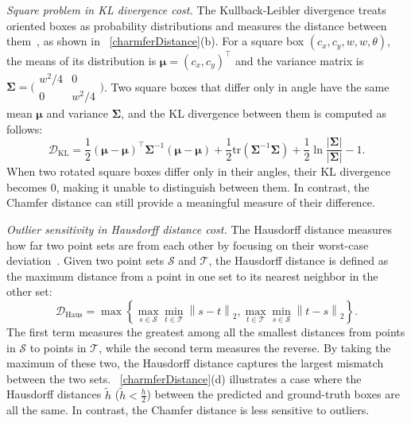 \documentclass[lettersize,journal]{IEEEtran}
\begin{document}
\textit{Square problem in KL divergence cost.}
The Kullback-Leibler divergence treats oriented boxes as probability distributions and measures the distance between them~\cite{kld}, as shown in \figurename~\ref{charmferDistance}(b). For a square box $(c_x, c_y, w, w, \theta)$, the means of its distribution is $\boldsymbol{\mu}=(c_x,c_y)^\top$ and the variance matrix is $\boldsymbol{\Sigma} = \bigl( \begin{smallmatrix} w^2 / 4 & 0 \\ 0 & w^2 / 4 \end{smallmatrix} \bigr)$. Two square boxes that differ only in angle have the same mean $\boldsymbol{\mu}$ and variance $\boldsymbol{\Sigma}$, and the KL divergence between them is computed as follows:
\begin{equation}
\mathcal{D}_{\text{KL}} = \frac{1}{2}(\boldsymbol{\mu}-\boldsymbol{\mu})^\top\boldsymbol{\Sigma}^{-1}(\boldsymbol{\mu}-\boldsymbol{\mu})+
\frac{1}{2}\mathrm{tr}(\boldsymbol{\Sigma}^{-1}\boldsymbol{\Sigma})+
\frac{1}{2}\ln\frac{\left|\boldsymbol{\Sigma}\right|}{\left|\boldsymbol{\Sigma}\right|}-1.
\end{equation}
When two rotated square boxes differ only in their angles, their KL divergence becomes 0, making it unable to distinguish between them. In contrast, the Chamfer distance can still provide a meaningful measure of their difference.



\textit{Outlier sensitivity in Hausdorff distance cost.}
The Hausdorff distance measures how far two point sets are from each other by focusing on their worst-case deviation~\cite{rhino}. Given two point sets $\mathcal{S}$ and $\mathcal{T}$, the Hausdorff distance is defined as the maximum distance from a point in one set to its nearest neighbor in the other set:
\begin{equation}
\mathcal{D}_{\text{Haus}} = \max \left \{ \max_{s\in\mathcal{S}} \min_{t\in\mathcal{T}}\left \| s-t \right \|_2, \max_{t\in\mathcal{T}} \min_{s\in\mathcal{S}}\left \| t-s \right \|_2 \right \}.
\end{equation}
The first term measures the greatest among all the smallest distances from points in $\mathcal{S}$ to points in $\mathcal{T}$, while the second term measures the reverse. By taking the maximum of these two, the Hausdorff distance captures the largest mismatch between the two sets. \figurename~\ref{charmferDistance}(d) illustrates a case where the Hausdorff distances $\tilde{h}$ ($\tilde{h}<\frac{h}{2}$) between the predicted and ground-truth boxes are all the same. In contrast, the Chamfer distance is less sensitive to outliers.
\end{document}

